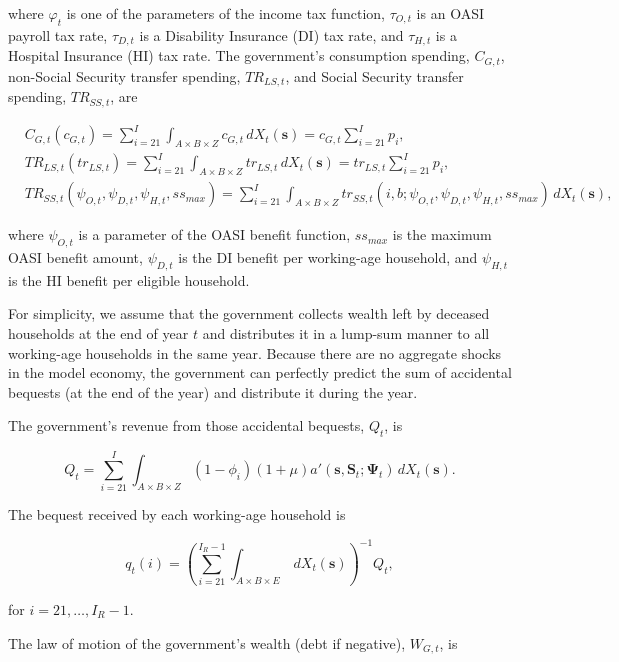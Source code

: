 \documentclass[11pt,leqno,fleqn]{article}
\begin{document}
where $\varphi_{t}$ is one of the parameters of the income tax function, $\tau_{O,t}$ is an OASI payroll tax rate, $\tau_{D,t}$ is a Disability Insurance (DI) tax rate, and $\tau_{H,t}$ is a Hospital Insurance (HI) tax rate. The government's consumption spending, $C_{G,t}$, non-Social Security transfer spending, $T\!R_{LS,t}$, and Social Security transfer spending, $T\!R_{SS,t}$, are

\begin{align}
	&C_{G,t}(c_{G,t})=\sum_{i=21}^{I}\int_{A\times B\times Z}c_{G,t}\,
	dX_{t}(\mathbf{s})=c_{G,t}\sum_{i=21}^{I}p_{i},\\
	&T\!R_{LS,t}(tr_{LS,t})=\sum_{i=21}^{I}\int_{A\times B\times Z}tr_{LS,t}\,
	dX_{t}(\mathbf{s})=tr_{LS,t}\sum_{i=21}^{I}p_{i},\\
	&T\!R_{SS,t}(\psi_{O,t},\psi_{D,t},\psi_{H,t},ss_{max})
	=\sum_{i=21}^{I}\int_{A\times B\times Z}
	tr_{SS,t}(i,b;\psi_{O,t},\psi_{D,t},\psi_{H,t},ss_{max})\,dX_{t}(\mathbf{s}),
\end{align}

where $\psi_{O,t}$ is a parameter of the OASI benefit function, $ss_{max}$ is the maximum OASI benefit amount, $\psi_{D,t}$ is the DI benefit per working-age household, and $\psi_{H,t}$ is the HI benefit per eligible household.

For simplicity, we assume that the government collects wealth left by deceased households at the end of year $t$ and distributes it in a lump-sum manner to all working-age households in the same year. Because there are no aggregate shocks in the model economy, the government can perfectly predict the sum of accidental bequests (at the end of the year) and distribute it during the year.

The government's revenue from those accidental bequests, $Q_{t}$, is

\begin{equation}
	Q_{t}=\sum_{i=21}^{I}\int_{A\times B\times Z}(1-\phi_{i})(1+\mu)
	a'(\mathbf{s},\mathbf{S}_{t};\mathbf{\Psi}_{t})\,
	dX_{t}(\mathbf{s}).
\end{equation}

The bequest received by each working-age household is

\begin{equation}
	q_{t}(i)=\left(\sum_{i=21}^{I_{R}-1}\int_{A\times B\times E}\,
	dX_{t}(\mathbf{s})\right)^{-1}Q_{t},
\end{equation}

for $i=21,\ldots,I_{R}-1$.

The law of motion of the government's wealth (debt if negative), $W_{G,t}$, is
\end{document}
